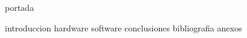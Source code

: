 \documentclass[pdftex,a4paper,12pt]{report}
\begin{document}
{portada}
\addtocounter{page}{1} %

\tableofcontents
{}
\thispagestyle{empty} %

{introduccion}
{hardware}
{software}
{conclusiones}
{bibliografia}
{anexos}

\listoftodos
\end{document}
